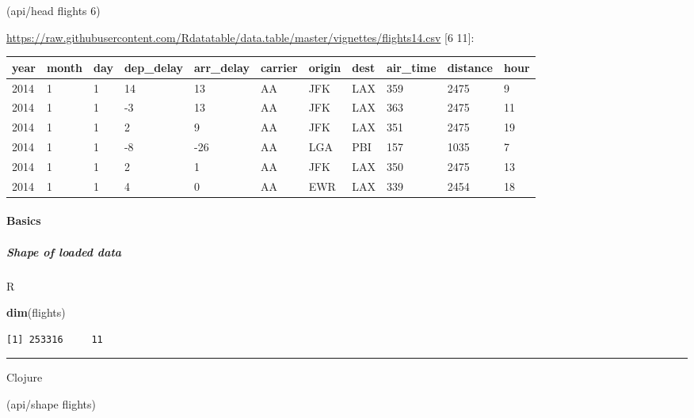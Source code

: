 \documentclass[]{article}
\newenvironment{Shaded}{\begin{snugshade}}{\end{snugshade}}
\newcommand{\KeywordTok}[1]{\textcolor[rgb]{0.13,0.29,0.53}{\textbf{#1}}}
\newcommand{\DecValTok}[1]{\textcolor[rgb]{0.00,0.00,0.81}{#1}}
\newcommand{\NormalTok}[1]{#1}
\let\oldparagraph\paragraph
\renewcommand{\paragraph}[1]{\oldparagraph{#1}\mbox{}}
\let\oldsubparagraph\subparagraph
\renewcommand{\subparagraph}[1]{\oldsubparagraph{#1}\mbox{}}
\begin{document}
\begin{Shaded}
\begin{Highlighting}[]
\NormalTok{(api/head flights }\DecValTok{6}\NormalTok{)}
\end{Highlighting}
\end{Shaded}

\url{https://raw.githubusercontent.com/Rdatatable/data.table/master/vignettes/flights14.csv}
{[}6 11{]}:

\begin{longtable}[]{@{}lllllllllll@{}}
\toprule
year & month & day & dep\_delay & arr\_delay & carrier & origin & dest &
air\_time & distance & hour\tabularnewline
\midrule
\endhead
2014 & 1 & 1 & 14 & 13 & AA & JFK & LAX & 359 & 2475 & 9\tabularnewline
2014 & 1 & 1 & -3 & 13 & AA & JFK & LAX & 363 & 2475 & 11\tabularnewline
2014 & 1 & 1 & 2 & 9 & AA & JFK & LAX & 351 & 2475 & 19\tabularnewline
2014 & 1 & 1 & -8 & -26 & AA & LGA & PBI & 157 & 1035 & 7\tabularnewline
2014 & 1 & 1 & 2 & 1 & AA & JFK & LAX & 350 & 2475 & 13\tabularnewline
2014 & 1 & 1 & 4 & 0 & AA & EWR & LAX & 339 & 2454 & 18\tabularnewline
\bottomrule
\end{longtable}

\paragraph{Basics}\label{basics}

\subparagraph{Shape of loaded data}\label{shape-of-loaded-data}

R

\begin{Shaded}
\begin{Highlighting}[]
\KeywordTok{dim}\NormalTok{(flights)}
\end{Highlighting}
\end{Shaded}

\begin{verbatim}
[1] 253316     11
\end{verbatim}

\begin{center}\rule{0.5\linewidth}{0.5pt}\end{center}

Clojure

\begin{Shaded}
\begin{Highlighting}[]
\NormalTok{(api/shape flights)}
\end{Highlighting}
\end{Shaded}
\end{document}
